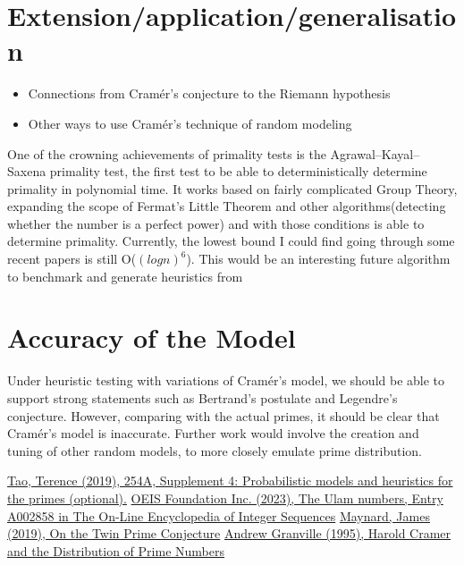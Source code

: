 \documentclass[conference]{IEEEtran}
\begin{document}
\section{Extension/application/generalisation}
\begin{itemize}
    \item Connections from Cram\'er's conjecture to the Riemann hypothesis
    \item Other ways to use Cram\'er's technique of random modeling
\end{itemize}
One of the crowning achievements of primality tests is the Agrawal–Kayal–Saxena primality test, the first test to be able to deterministically determine primality in polynomial time. It works based on fairly complicated Group Theory, expanding the scope of Fermat's Little Theorem and other algorithms(detecting whether the number is a perfect power) and with those conditions is able to determine primality. Currently, the lowest bound I could find going through some recent papers is still O($(log n)^6$). This would be an interesting future algorithm to benchmark and generate heuristics from


\section{Accuracy of the Model}

Under heuristic testing with variations of Cram\'er's model, we should be able to support strong statements such as Bertrand's postulate and Legendre's conjecture. However, comparing with the actual primes, it should be clear that Cram\'er's model is inaccurate. Further work would involve the creation and tuning of other random models, to more closely emulate prime distribution.


\begin{thebibliography}{00}
     \href{https://terrytao.wordpress.com/2015/01/04/254a-supplement-4-probabilistic-models-and-heuristics-for-the-primes-optional.}{Tao, Terence (2019), 254A, Supplement 4: Probabilistic models and heuristics for the primes (optional).}
     \href{https://oeis.org/A002858}{OEIS Foundation Inc. (2023), The Ulam numbers, Entry A002858 in The On-Line Encyclopedia of Integer Sequences}
     \href{https://arxiv.org/abs/1910.14674}{Maynard, James (2019), On the Twin Prime Conjecture}
     \href{https://chance.dartmouth.edu/chance_news/for_chance_news/Riemann/cramer.pdf}{Andrew Granville (1995), Harold Cramer and the Distribution of Prime Numbers}
\end{thebibliography}
\vspace{12pt}
\end{document}
